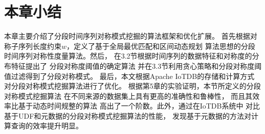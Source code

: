 \section{本章小结}
本章主要介绍了分段时间序列对称模式挖掘的算法框架和优化扩展。
首先根据对称子序列长度约束$w$，定义了基于全局最优匹配和区间动态规划
算法思想的分段时间序列对称性度量算法。然后，
在3.2节根据时间序列的数据特征和对称度的分布特征提出了
分段对称度阈值的确定算法
并在3.3节利用贪心策略和分段对称度阈值过滤得到了分段对称模式。
最后，本文根据Apache IoTDB的存储和计算方式
对分段对称模式挖掘算法进行了优化。
根据第5章的实验证明，本节所定义的分段对称模式挖掘算法
在不同来源的数据集上具有更高的准确性和鲁棒性，
而且其效率比基于动态时间规整的算法
高出了一个阶数。此外，通过在IoTDB系统中
对比基于UDF和元数据的分段对称模式挖掘算法的性能，
发现基于元数据的方法对计算查询的效率提升明显。










